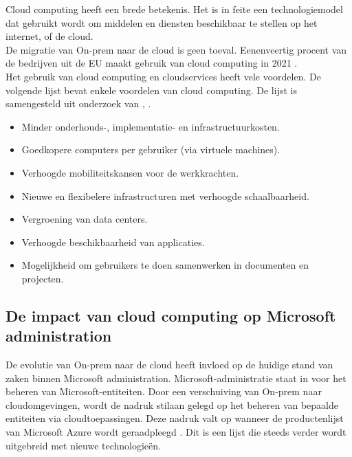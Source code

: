 
Cloud computing heeft een brede betekenis. Het is in feite een technologiemodel dat gebruikt wordt om middelen en diensten beschikbaar te stellen op het internet, of de cloud. \autocite{Haag2009} \\

De migratie van \ac{On-prem} naar de cloud is geen toeval. Eenenveertig procent van de bedrijven uit de \ac{EU} maakt gebruik van cloud computing in 2021 \autocite{EU2021}. \\

Het gebruik van cloud computing en cloudservices heeft vele voordelen. De volgende lijst bevat enkele voordelen van cloud computing. De lijst is samengesteld uit onderzoek van \textcite{Aljabre2012}, \textcite{Rittinghouse2016}.

\begin{itemize}
    \item Minder onderhouds-, implementatie- en infrastructuurkosten.
    \item Goedkopere computers per gebruiker (via virtuele machines).
    \item Verhoogde mobiliteitskansen voor de werkkrachten.
    \item Nieuwe en flexibelere infrastructuren met verhoogde schaalbaarheid.
    \item Vergroening van data centers.
    \item Verhoogde beschikbaarheid van applicaties.
    \item Mogelijkheid om gebruikers te doen samenwerken in documenten en projecten.
\end{itemize}

\subsection{De impact van cloud computing op Microsoft administration}


De evolutie van \ac{On-prem} naar de cloud heeft invloed op de huidige stand van zaken binnen Microsoft administration. Microsoft-administratie staat in voor het beheren van Microsoft-entiteiten. Door een verschuiving van \ac{On-prem} naar cloudomgevingen, wordt de nadruk stilaan gelegd op het beheren van bepaalde entiteiten via cloudtoepassingen. Deze nadruk valt op wanneer de productenlijst van Microsoft Azure wordt geraadpleegd \autocite{Microsoft2023b}. Dit is een lijst die steeds verder wordt uitgebreid met nieuwe technologieën. \\

